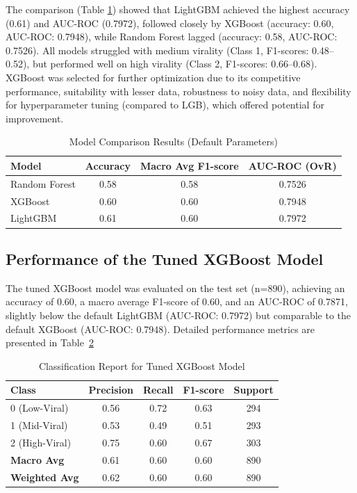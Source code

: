 \documentclass[12pt,a4paper]{report}
\begin{document}
The comparison (Table \ref{tab:model_performance}) showed that LightGBM achieved the highest accuracy (0.61) and AUC-ROC (0.7972), followed closely by XGBoost (accuracy: 0.60, AUC-ROC: 0.7948), while Random Forest lagged (accuracy: 0.58, AUC-ROC: 0.7526). All models struggled with medium virality (Class 1, F1-scores: 0.48–0.52), but performed well on high virality (Class 2, F1-scores: 0.66–0.68). XGBoost was selected for further optimization due to its competitive performance, suitability with lesser data, robustness to noisy data, and flexibility for hyperparameter tuning (compared to LGB), which offered potential for improvement.

\begin{table}[h]
\centering
\caption{Model Comparison Results (Default Parameters)}
\label{tab:model_performance}
\begin{tabular}{lccc}
\toprule
\textbf{Model} & \textbf{Accuracy} & \textbf{Macro Avg F1-score} & \textbf{AUC-ROC (OvR)} \\
\midrule
Random Forest & 0.58 & 0.58 & 0.7526 \\
XGBoost       & 0.60 & 0.60 & 0.7948 \\
LightGBM      & 0.61 & 0.60 & 0.7972 \\
\bottomrule
\end{tabular}
\end{table}


\subsection{Performance of the Tuned XGBoost Model}
The tuned XGBoost model was evaluated on the test set (n=890), achieving an accuracy of 0.60, a macro average F1-score of 0.60, and an AUC-ROC of 0.7871, slightly below the default LightGBM (AUC-ROC: 0.7972) but comparable to the default XGBoost (AUC-ROC: 0.7948). Detailed performance metrics are presented in Table~\ref{tab:classification_report_xgboost} 

\begin{table}[h]
\centering
\caption{Classification Report for Tuned XGBoost Model}
\label{tab:classification_report_xgboost}
\begin{tabular}{lcccc}
\toprule
\textbf{Class} & \textbf{Precision} & \textbf{Recall} & \textbf{F1-score} & \textbf{Support} \\
\midrule
0 (Low-Viral)     & 0.56 & 0.72 & 0.63 & 294 \\
1 (Mid-Viral)     & 0.53 & 0.49 & 0.51 & 293 \\
2 (High-Viral)    & 0.75 & 0.60 & 0.67 & 303 \\
\midrule
\textbf{Macro Avg}    & 0.61 & 0.60 & 0.60 & 890 \\
\textbf{Weighted Avg} & 0.62 & 0.60 & 0.60 & 890 \\
\bottomrule
\end{tabular}
\end{table}
\end{document}
